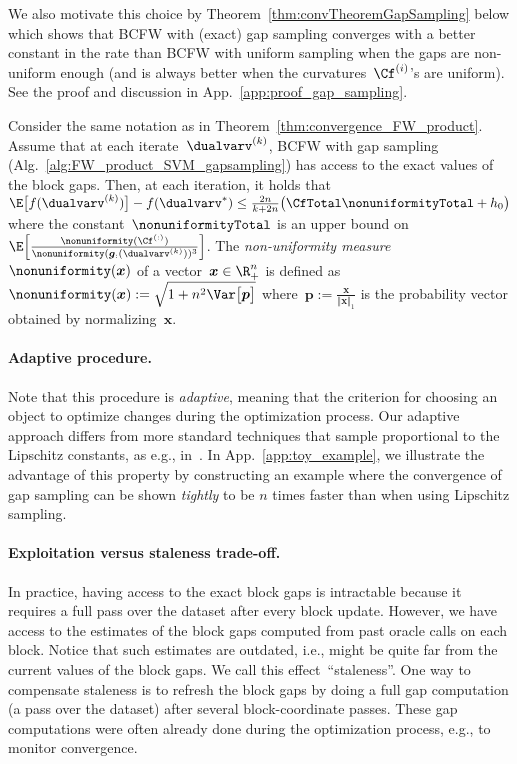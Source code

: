 \documentclass{article}
\begin{document}
We also motivate this choice by Theorem~\ref{thm:convTheoremGapSampling} below which shows that BCFW with (exact) gap sampling converges with a better constant in the rate than BCFW with uniform sampling when the gaps are non-uniform enough (and is always better when the curvatures~$\Cf^{(i)}$'s are uniform). See the proof and discussion in App.~\ref{app:proof_gap_sampling}.

\begin{theorem}\label{thm:convTheoremGapSampling}
Consider the same notation as in Theorem~\ref{thm:convergence_FW_product}.
Assume that at each iterate~$\dualvarv^{(k)}$, BCFW with gap sampling (Alg.~\ref{alg:FW_product_SVM_gapsampling}) has access to the exact values of the block gaps. 
Then, at each iteration, it holds that
$
\E \big[f(\dualvarv^{(k)})\big] - f(\dualvarv^*) \le \frac{2n}{k+2n}\big(\CfTotal \nonuniformityTotal + h_0\big)
$
%
where the constant~$\nonuniformityTotal$ is an upper bound on $\E \Big[ \frac{\nonuniformity(\Cf^{(:)})}{\nonuniformity(\bm{g}_{:}(\dualvarv^{(k)}))^3} \Big]$. The \emph{non-uniformity measure} $\nonuniformity(\bm{x})$ of a vector~$\bm{x}\in\R^n_+$ is defined as
$
\nonuniformity(\bm{x}) 
:=  
\sqrt{1+n^2\Var \big[\bm{p}\big]}
%
$
where~$\bm{p} := \frac{\bm{x}}{\Vert \bm{x} \Vert_1}$ is the probability vector obtained by normalizing~$\bm{x}$.
%
\end{theorem}

%
%
%
%
%
%
%

%


%
%
%
%
%
%
%
%
%
%
%
\vspace{-2mm}
\paragraph{Adaptive procedure.} 
Note that this procedure is \emph{adaptive}, meaning that the criterion for choosing an object to optimize changes during the optimization process.
Our adaptive approach differs from more standard techniques that sample proportional to the Lipschitz constants, as e.g., in~\citet{Nesterov:2012fa}.
%
In App.~\ref{app:toy_example}, we illustrate the advantage of this property by constructing an example where the convergence of gap sampling can be shown \emph{tightly} to be $n$ times faster than when using Lipschitz sampling.

\vspace{-2mm}
\paragraph{Exploitation versus staleness trade-off.}
In practice, having access to the exact block gaps is intractable because it requires a full pass over the dataset after every block update.
However, we have access to the estimates of the block gaps computed from past oracle calls on each block.
%
%
%
Notice that such estimates are outdated, i.e., might be quite far from the current values of the block gaps. We call this effect~``staleness''.
One way to compensate staleness is to refresh the block gaps by doing a full gap computation (a pass over the dataset) after several block-coordinate passes. These gap computations were often already done during the optimization process, e.g., to monitor convergence.
\end{document}
